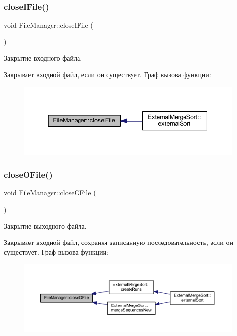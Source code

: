 \subsubsection{\texorpdfstring{close\+I\+File()}{closeIFile()}}
{\footnotesize\ttfamily void File\+Manager\+::close\+I\+File (\begin{DoxyParamCaption}{ }\end{DoxyParamCaption})}



Закрытие входного файла. 

Закрывает входной файл, если он существует. Граф вызова функции\+:\nopagebreak
\begin{figure}[H]
\begin{center}
\leavevmode
\includegraphics[width=337pt]{class_file_manager_a4a4719a410ca31985e8b75ad75485ce6_icgraph}
\end{center}
\end{figure}
\hypertarget{class_file_manager_a6a1f1ddbf047fc7e9531f483e4c62148}{}\label{class_file_manager_a6a1f1ddbf047fc7e9531f483e4c62148} 
\subsubsection{\texorpdfstring{close\+O\+File()}{closeOFile()}}
{\footnotesize\ttfamily void File\+Manager\+::close\+O\+File (\begin{DoxyParamCaption}{ }\end{DoxyParamCaption})}



Закрытие выходного файла. 

Закрывает входной файл, сохраняя записанную последовательность, если он существует. Граф вызова функции\+:\nopagebreak
\begin{figure}[H]
\begin{center}
\leavevmode
\includegraphics[width=350pt]{class_file_manager_a6a1f1ddbf047fc7e9531f483e4c62148_icgraph}
\end{center}
\end{figure}
\hypertarget{class_file_manager_a73fc5901898b3a82441dc0e7b5a9ccf7}{}\label{class_file_manager_a73fc5901898b3a82441dc0e7b5a9ccf7} 
